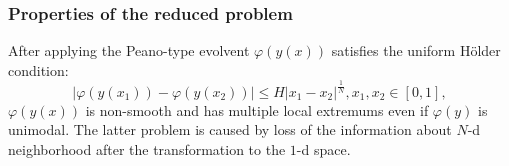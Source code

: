 \documentclass[aspectratio=1610]{beamer}
\begin{document}
\begin{frame}
  \frametitle{Properties of the reduced problem}
  After applying the Peano-type evolvent \(\varphi(y(x))\) satisfies the uniform H{\"o}lder condition:
  \begin{displaymath}
    |\varphi(y(x_1))-\varphi(y(x_2))|\leq H{|x_1-x_2|}^{\frac{1}{N}}, x_1,x_2\in[0,1],
  \end{displaymath}
  \(\varphi(y(x))\) is non-smooth and has multiple local extremums even if \(\varphi(y)\) is unimodal.
  The latter problem is caused by loss of the information about \(N\)-d neighborhood after the transformation to the \(1\)-d space.

  \begin{figure}[ht]
    \begin{center}

    \vspace*{-0.5cm}
  \end{center}
  \end{figure}
\end{frame}
\end{document}
